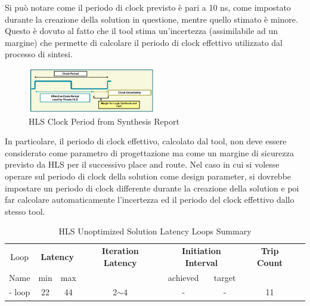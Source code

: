 Si può notare come il periodo di clock previsto è pari a 10 ns, come impostato durante la creazione della solution in questione, mentre quello stimato è minore. Questo è dovuto al fatto che il tool stima un'incertezza (assimilabile ad un margine) che permette di calcolare il periodo di clock effettivo utilizzato dal processo di sintesi.
\begin{figure}[H]
    \centering
    \includegraphics[width=0.5\textwidth]{solutions/unoptimized/clockperiod.png}
    \caption{HLS Clock Period from Synthesis Report}
\end{figure}

In particolare, il periodo di clock effettivo, calcolato dal tool, non deve essere considerato come parametro di progettazione ma come un margine di sicurezza previsto da HLS per il successivo place and route. Nel caso in cui si volesse operare sul periodo di clock della solution come design parameter, si dovrebbe impostare un periodo di clock differente durante la creazione della solution e poi far calcolare automaticamente l'incertezza ed il periodo del clock effettivo dallo stesso tool.

\begin{table}[H]
    \centering
    \begin{tabular}{|c|c|c|c|c|c|c|c|}
        \hline
        \multicolumn{1}{|c|}{Loop} & \multicolumn{2}{|c|}{\textbf{Latency}} & \multicolumn{1}{c|}{\textbf{Iteration Latency}} & \multicolumn{2}{c|}{\textbf{Initiation Interval}} & \multicolumn{1}{c|}{\textbf{Trip Count}}  \\
        Name & min & max &  & achieved & target &  \\
        \hline
        - loop & 22 & 44 & 2$\sim$4 & - & - & 11 \\
        \hline
    \end{tabular}
    \caption{HLS Unoptimized Solution Latency Loops Summary }
    \label{tab:hls-unoptimized-solution-loop-summary}
\end{table}

